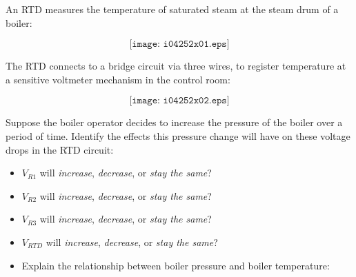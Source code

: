 

An RTD measures the temperature of saturated steam at the steam drum of a boiler:

$$\texttt{[image: i04252x01.eps]}$$

The RTD connects to a bridge circuit via three wires, to register temperature at a sensitive voltmeter mechanism in the control room:

$$\texttt{[image: i04252x02.eps]}$$

Suppose the boiler operator decides to increase the pressure of the boiler over a period of time.  Identify the effects this pressure change will have on these voltage drops in the RTD circuit:

\begin{itemize}
\item{} $V_{R1}$ will {\it increase}, {\it decrease}, or {\it stay the same}?
\item{} $V_{R2}$ will {\it increase}, {\it decrease}, or {\it stay the same}?
\item{} $V_{R3}$ will {\it increase}, {\it decrease}, or {\it stay the same}?
\item{} $V_{RTD}$ will {\it increase}, {\it decrease}, or {\it stay the same}?
\item{} Explain the relationship between boiler pressure and boiler temperature:
\end{itemize}







